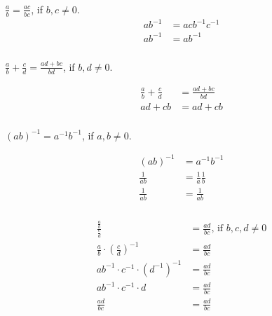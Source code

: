 \documentclass[12pt]{article}
\begin{document}
\subsubsection{}
$\frac{a}{b}=\frac{ac}{bc}$, if $b,c\neq 0$.
\begin{equation*}
\begin{split}
ab^{-1} &= acb^{-1}c^{-1}\\ 
ab^{-1} &= ab^{-1}
\end{split}
\end{equation*}

\subsubsection{}
$\frac{a}{b}+ \frac{c}{d}=\frac{ad+bc}{bd}$, if $b,d\neq 0$.

\begin{equation*}
\begin{split}
\frac{a}{b}+ \frac{c}{d} &= \frac{ad+bc}{bd}\\
ad+cb&=ad+cb
\end{split}
\end{equation*}

\subsubsection{}
$(ab)^{-1}= a^{-1}b^{-1}$, if $a,b \neq 0$.

\begin{equation*}
\begin{split}
(ab)^{-1} &= a^{-1}b^{-1}\\
\frac{1}{ab} &= \frac{1}{a}\frac{1}{b}\\
\frac{1}{ab} &= \frac{1}{ab}
\end{split}
\end{equation*}

\subsubsection{}

\subsubsection{}

\begin{equation*}
\begin{split}
\frac{\frac{a}{b}}{\frac{c}{d}} &= \frac{ad}{bc} \text{, if } b,c,d \neq 0\\
\frac{a}{b}\cdot (\frac{c}{d})^{-1} &=  \frac{ad}{bc}\\
ab^{-1}\cdot c^{-1} \cdot (d^{-1})^{-1} &=  \frac{ad}{bc}\\
ab^{-1}\cdot c^{-1} \cdot d &=  \frac{ad}{bc}\\
\frac{ad}{bc} &=  \frac{ad}{bc}
\end{split}
\end{equation*}
\end{document}
